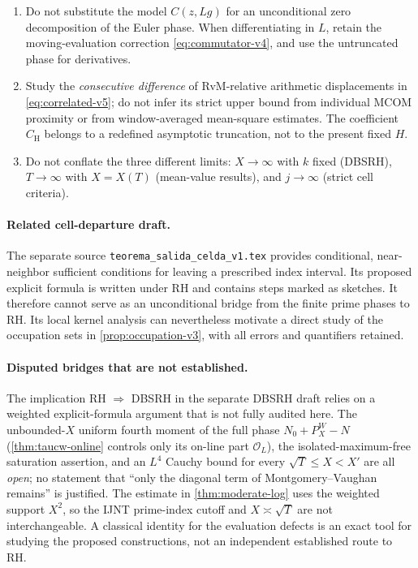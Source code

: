 \documentclass[11pt,a4paper]{article}
\numberwithin{equation}{section}
\theoremstyle{definition}
\theoremstyle{remark}
\begin{document}
\begin{enumerate}[leftmargin=*,itemsep=4pt]
$T\to\infty$.
\item Do not substitute the model $C(z,Lg)$ for an unconditional zero decomposition of the Euler phase. When differentiating in $L$, retain the moving-evaluation correction \eqref{eq:commutator-v4}, and use the untruncated phase for derivatives.
\item Study the \emph{consecutive difference} of RvM-relative arithmetic displacements in \eqref{eq:correlated-v5}; do not infer its strict upper bound from individual MCOM proximity or from window-averaged mean-square estimates. The coefficient $C_{\mathrm H}$ belongs to a redefined asymptotic truncation, not to the present fixed $H$.
\item Do not conflate the three different limits: $X\to\infty$
with $k$ fixed (DBSRH), $T\to\infty$ with $X=X(T)$ (mean-value
results), and $j\to\infty$ (strict cell criteria).
\end{enumerate}

\paragraph{Related cell-departure draft.}
The separate source \texttt{teorema\_salida\_celda\_v1.tex} provides
conditional, near-neighbor sufficient conditions for leaving a prescribed
index interval. Its proposed explicit formula is written under RH and
contains steps marked as sketches. It therefore cannot serve as an
unconditional bridge from the finite prime phases to RH. Its local
kernel analysis can nevertheless motivate a direct study of the
occupation sets in \cref{prop:occupation-v3}, with all errors
and quantifiers retained.

\paragraph{Disputed bridges that are not established.}
The implication RH $\Rightarrow$ DBSRH in the separate DBSRH draft
relies on a weighted explicit-formula argument that is not fully
audited here. The unbounded-$X$ uniform fourth moment of the full phase $N_0+P_X^W-N$ (\cref{thm:taucw-online} controls only its on-line part $\mathcal O_L$), the
isolated-maximum-free saturation assertion, and an $L^4$ Cauchy bound
for every $\sqrt T\le X<X'$ are all \emph{open}; no statement that
``only the diagonal term of Montgomery--Vaughan remains'' is justified.
The estimate in \cref{thm:moderate-log} uses the weighted support
$X^2$, so the IJNT prime-index cutoff and $X\asymp\sqrt T$ are not
interchangeable. A classical identity for the evaluation defects
is an exact tool for studying the proposed constructions, not an
independent established route to RH.
\end{document}
